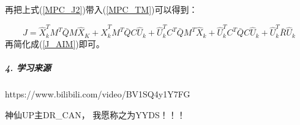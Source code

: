 \documentclass[UTF8,a4paper,10pt]{ctexart}
\begin{document}
再把上式(\ref{MPC_J2})带入(\ref{MPC_TM})可以得到：

\begin{equation}
    J = \hat{X}_k^T M^T \bar{Q} M \hat{X}_K + \hat{X}_k^T M^T \bar{Q} C \hat{U}_k
    + \hat{U}_k^T C^T \bar{Q} M^T \hat{X}_k
    + \hat{U}_k^T C^T \bar{Q} C \hat{U}_k + \hat{U}_k^T \bar{R} \hat{U}_k
\end{equation}
再简化成(\ref{J_AIM})即可。


\subparagraph{4. 学习来源} https://www.bilibili.com/video/BV1SQ4y1Y7FG


    神仙UP主DR\_CAN， 我愿称之为YYDS！！！
    
\end{document}
